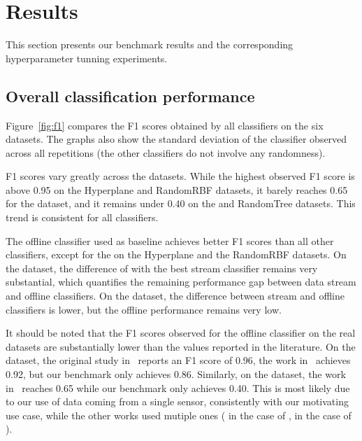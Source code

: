 \section{Results}
This section presents our benchmark results and the corresponding
hyperparameter tunning experiments.


\subsection{Overall classification performance}

Figure~\ref{fig:f1} compares the F1 scores obtained by all classifiers on
the six datasets. The graphs also show the standard deviation of the
\mondrianforest classifier observed across all repetitions (the other
classifiers do not involve any randomness). 

F1 scores vary greatly across the datasets. While the highest
observed F1 score is above 0.95 on the Hyperplane and RandomRBF datasets,
it barely reaches 0.65 for the \banosdataset dataset, and it remains under
0.40 on the \recofitdataset and RandomTree datasets. This trend is
consistent for all classifiers.

The offline \knn classifier used as baseline achieves better F1 scores than
all other classifiers, except for the \mondrianforest on the Hyperplane and
the RandomRBF datasets. On the \banosdataset dataset, the difference of
 with the best stream classifier remains very substantial, which
quantifies the remaining performance gap between data stream and offline
classifiers. On the \recofitdataset dataset, the difference between stream
and offline classifiers is lower, but the offline performance remains very
low.

It should be noted that the F1 scores observed for the offline \knn
classifier on the real datasets are substantially lower than the values
reported in the literature. On the \banosdataset dataset, the original
study in~\cite{Banos_2014} reports an F1 score of 0.96, the work
in~\cite{behzad2019} achieves 0.92, but our benchmark only achieves 0.86.
Similarly, on the \recofitdataset dataset,  the
work in~\cite{behzad2019} reaches 0.65 while our benchmark only achieves
0.40. This is most likely due to our use of data coming from a single
sensor, consistently with our motivating use case, while the other works used mutiple ones ( in the case of
\banosdataset,  in the case of \recofitdataset).

